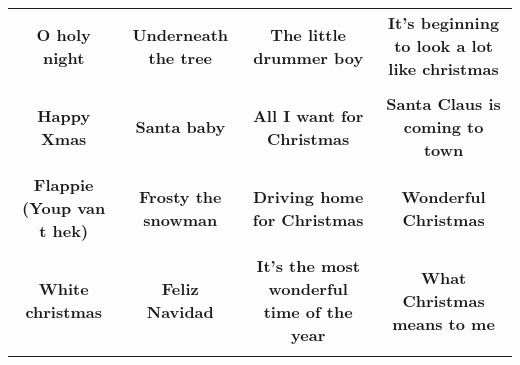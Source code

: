 \documentclass[12pt]{article} \usepackage{eso-pic, graphicx}
\newcommand{\background}[1]{%
\AddToShipoutPictureBG*{\texttt{[image: \#1]}}
}
\begin{document}
\tabcolsep=30.2pt \renewcommand{\arraystretch}{4.5}   \vspace*{4.3cm} \begin{center}  \begin{tabular}{c c c c}
\parbox{3cm}{\centering \textbf{O holy night}}& 
\parbox{3cm}{\centering \textbf{Underneath the tree}}& 
\parbox{3cm}{\centering \textbf{The little drummer boy}}& 
\parbox{3cm}{\centering \textbf{It’s beginning to look a lot like christmas}}\\ \\ 
\parbox{3cm}{\centering \textbf{Happy Xmas}}& 
\parbox{3cm}{\centering \textbf{Santa baby}}& 
\parbox{3cm}{\centering \textbf{All I want for Christmas}}& 
\parbox{3cm}{\centering \textbf{Santa Claus is coming to town}}\\ \\ 
\parbox{3cm}{\centering \textbf{Flappie (Youp van t hek)}}& 
\parbox{3cm}{\centering \textbf{Frosty the snowman}}& 
\parbox{3cm}{\centering \textbf{Driving home for Christmas}}& 
\parbox{3cm}{\centering \textbf{Wonderful Christmas}}\\ \\ 
\parbox{3cm}{\centering \textbf{White christmas}}& 
\parbox{3cm}{\centering \textbf{Feliz Navidad}}& 
\parbox{3cm}{\centering \textbf{It’s the most wonderful time of the year}}& 
\parbox{3cm}{\centering \textbf{What Christmas means to me}}\\ \\ 
\end{tabular} \background{discobingo.pdf} \end{center} 
\end{document}
